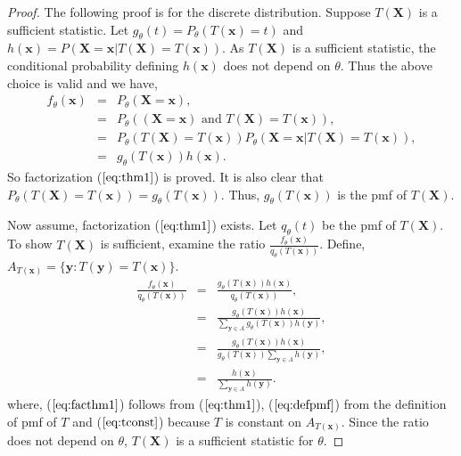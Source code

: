 \documentclass[a4paper,english,12pt]{article}
\newcommand{\bx}{\mathbf{x}}
\newcommand{\by}{\mathbf{y}}
\newcommand{\bX}{\mathbf{X}}
\begin{document}
\begin{proof}
The following proof is for the discrete distribution. Suppose $T(\bX)$ is a sufficient statistic. Let $g_\theta(t) = P_\theta (T(\bx)=t)$ and $h(\bx)=P(\bX=\bx|T(\bX)=T(\bx))$. As $T(\bX)$ is a sufficient statistic, the conditional probability defining $h(\bx)$ does not depend on $\theta$. Thus the above choice is valid and we have,
\begin{eqnarray}
f_\theta(\bx) &=& P_\theta(\bX=\bx), \nonumber \\
&=& P_\theta((\bX=\bx) \text { and } T(\bX)=T(\bx)),\nonumber \\
&=& P_\theta(T(\bX)= T(\bx))P_\theta(\bX=\bx | T(\bX)=T(\bx)),\nonumber \\
&=& g_\theta (T(\bx))h(\bx).
\end{eqnarray}
So factorization ($\ref{eq:thm1}$) is proved. It is also clear that $P_\theta(T(\bX)=T(\bx)) = g_\theta (T(\bx))$. Thus, $g_\theta (T(\bx))$ is the pmf of $T(\bX)$.
\par Now assume, factorization ($\ref{eq:thm1}$) exists. Let $q_\theta(t)$ be the pmf of $T(\bX)$. To show $T(\bX)$ is sufficient, examine the ratio $\frac{f_\theta (\bx)}{q_\theta (T(\bx))}$. Define, $ A_{T(\bx)}=\{\by:T(\by)=T(\bx)\}$.
\begin{eqnarray}
\frac{f_\theta (\bx)}{q_\theta (T(\bx))} &=& \frac{g_\theta (T(\bx))h(\bx)}{q_\theta (T(\bx))}, \label{eq:facthm1}\\
&=& \frac{g_\theta (T(\bx))h(\bx)}{\sum_{\by \in A} {g_\theta (T(\bx))h(\by)}}, \label{eq:defpmf}\\
&=& \frac{g_\theta (T(\bx))h(\bx)}{g_\theta (T(\bx)) \sum_{\by \in A} {h(\by)}}, \label{eq:tconst}\\
&=& \frac{h(\bx)}{\sum_{\by \in A} {h(\by)}}. 
\end{eqnarray}
where, ($\ref{eq:facthm1}$) follows from ($\ref{eq:thm1}$), ($\ref{eq:defpmf}$) from the definition of pmf of $T$ and ($\ref{eq:tconst}$) because $T$ is constant on $ A_{T(\bx)}$.
Since the ratio does not depend on $\theta$, $T(\bX)$ is a sufficient statistic for $\theta$.
\end{proof}
\end{document}
